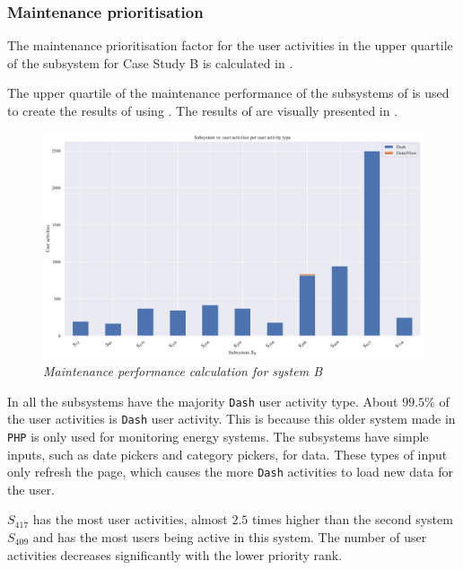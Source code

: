\subsubsection{Maintenance prioritisation}
The maintenance prioritisation factor for the user activities in the upper quartile of the subsystem for Case Study B is calculated in .



The upper quartile of the maintenance performance of the subsystems of  is used to create the results of  using . The results of  are visually presented in .

\clearpage

\begin{figure}[!htb]
	\centering %
	\includegraphics[width=0.95\linewidth]{img/ch3/analysis/case_B_subsystems_1.pdf}
	\caption[Maintenance performance calculation for system B]
	{\textit{Maintenance performance calculation for system B}}\label{fig:ch3_systemsBBar}
\end{figure} 

In  all the subsystems have the majority \texttt{Dash} user activity type. About $99.5\%$ of the user activities is \texttt{Dash} user activity. This is because this older system made in \texttt{PHP} is only used for monitoring energy systems. The subsystems have simple inputs, such as date pickers and category pickers, for data. These types of input only refresh the page, which causes the more \texttt{Dash} activities to load new data for the user.\par $S_{417}$ has the most user activities, almost $2.5$ times higher than the second system $S_{409}$ and has the most users being active in this system. The number of user activities decreases significantly with the lower priority rank.

